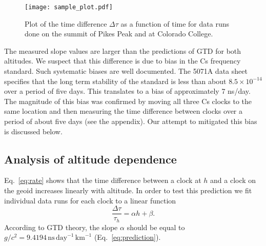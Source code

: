 \documentclass[prb,preprint]{revtex4-1}
\begin{document}
\begin{figure}[ht!] 
\centering
\texttt{[image: sample\_plot.pdf]}
\caption{Plot of the time difference $\Delta \tau$ as a function of time for data runs done on the summit of Pikes Peak and at Colorado College.}
\label{fig:sample_plot}
\end{figure}

The measured slope values are larger than the predictions of GTD for both altitudes. We suspect that this difference is due to bias in the Cs frequency standard. Such systematic biases are well documented.\cite{shirley2001} The 5071A data sheet\cite{5017Adatasheet} specifies that the long term stability of the standard is less than about $8.5 \times 10^{-14}$ over a period of five days. This translates to a bias of approximately 7 ns/day. The magnitude of this bias was confirmed by moving all three Cs clocks to the same location and then measuring the time difference between clocks over a period of about five days (see the appendix). Our attempt to mitigated this bias is discussed below. 

\subsection{Analysis of altitude dependence}
Eq.~\ref{eq:rate} shows that the time difference between a clock at $h$ and a clock on the geoid increases linearly with altitude. In order to test this prediction we fit individual data runs for each clock to a linear function 
\begin{equation}
\label{eq:altitude_fit}
\frac{\Delta \tau}{\tau_h} = \alpha h + \beta. 
\end{equation}
According to GTD theory, the slope $\alpha$ should be equal to $g/c^2 = 9.4194\, \mathrm{ns}\, \mathrm{day}^{-1}\, \mathrm{km}^{-1}$ (Eq.~\ref{eq:prediction}).
\end{document}
